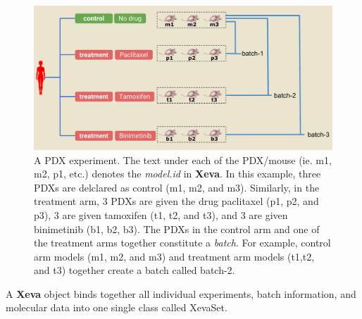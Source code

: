 \documentclass{article}\usepackage[]{graphicx}\usepackage[]{xcolor}
\begin{document}
\begin{figure}[!ht]
    \centering
    \includegraphics[keepaspectratio=true,width=1\textwidth]{images/Xeva_batch_2.pdf}
    \caption{A PDX experiment. The text under each of the PDX/mouse (ie. m1, m2, p1, etc.) denotes the \textit{model.id} in \textbf{Xeva}. In this example, three PDXs are delclared as control (m1, m2, and m3). Similarly, in the treatment arm, 3 PDXs are given the drug paclitaxel (p1, p2, and p3), 3 are given tamoxifen (t1, t2, and t3), and 3 are given binimetinib (b1, b2, b3). The PDXs in the control arm and one of the treatment arms together constitute a \textit{batch}. For example, control arm models (m1, m2, and m3) and treatment arm models (t1,t2, and t3) together create a batch called batch-2. } \label{fig:1}
\end{figure}

A \textbf{Xeva} object binds together all individual experiments, batch information, and molecular data into one single class called XevaSet.
\end{document}
